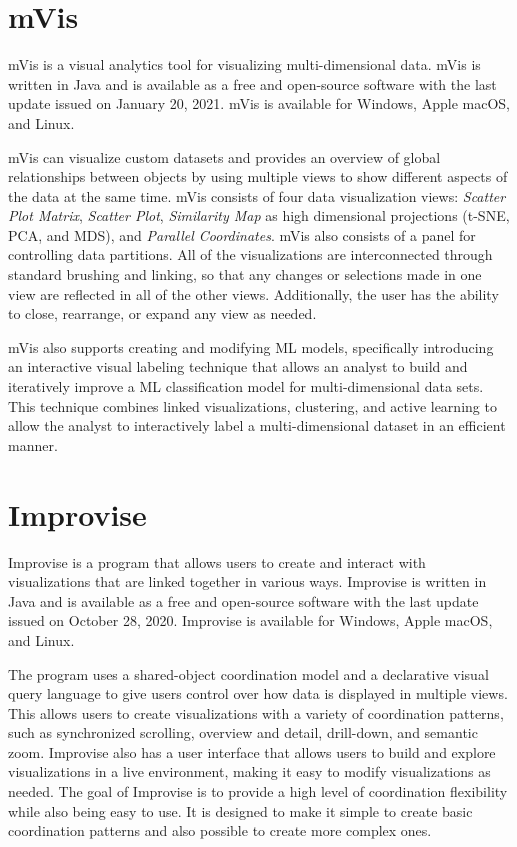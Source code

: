 \section{mVis}

mVis \parencite{CHEGINI20199} is a visual analytics tool for
visualizing multi-dimensional data. mVis is written in Java and is
available as a free and open-source software with the last update
issued on January 20, 2021. mVis is available for Windows, Apple
macOS, and Linux.

mVis can visualize custom datasets and provides an overview of global
relationships between objects by using multiple views to show
different aspects of the data at the same time. mVis consists of four
data visualization views: \emph{Scatter Plot Matrix}, \emph{Scatter
Plot}, \emph{Similarity Map} as high dimensional projections (t-SNE,
PCA, and MDS), and \emph{Parallel Coordinates}. mVis also consists of
a panel for controlling data partitions. All of the visualizations are
interconnected through standard brushing and linking, so that any
changes or selections made in one view are reflected in all of the
other views. Additionally, the user has the ability to close,
rearrange, or expand any view as needed.

mVis also supports creating and modifying ML models, specifically
introducing an interactive visual labeling technique that allows an
analyst to build and iteratively improve a ML classification model for
multi-dimensional data sets. This technique combines linked
visualizations, clustering, and active learning to allow the analyst
to interactively label a multi-dimensional dataset in an efficient
manner.



\section{Improvise}

Improvise \parencite{Improvise} is a program that allows users to
create and interact with visualizations that are linked together in
various ways. Improvise is written in Java and is available as a free
and open-source software with the last update issued on October 28,
2020. Improvise is available for Windows, Apple macOS, and Linux.

The program uses a shared-object coordination model and a declarative
visual query language to give users control over how data is displayed
in multiple views. This allows users to create visualizations with a
variety of coordination patterns, such as synchronized scrolling,
overview and detail, drill-down, and semantic zoom. Improvise also has
a user interface that allows users to build and explore visualizations
in a live environment, making it easy to modify visualizations as
needed. The goal of Improvise is to provide a high level of
coordination flexibility while also being easy to use. It is designed
to make it simple to create basic coordination patterns and also
possible to create more complex ones.




